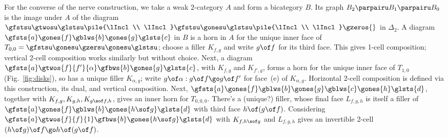 For the converse of the nerve construction, we take a weak $2$-category $A$
and form a bicategory $B$.  Its graph $B_2 \parpairu B_1 \parpairu B_0$ is
the image under $A$ of the diagram $\gfstsu\gtwosu\glstsu \pile{\lIncl \\
\lIncl} \gfstsu\gonesu\glstsu \pile{\lIncl \\ \lIncl} \gzeros{}$ in
$\Delta_2$.  A diagram $\gfsts{a}\gones{f}\gblws{b}\gones{g}\glsts{c}$ in $B$
is a horn in $A$ for the unique inner face of $T_{0,0} =
\gfstsu\gonesu\gzersu\gonesu\glstsu$; choose a filler $K_{f,g}$ and write
$g\of f$ for its third face.  This gives 1-cell composition; vertical 2-cell
composition works similarly but without choice.  Next, a diagram
$\gfsts{a}\gtwos{f}{f'}{\alpha}\gfbws{b}\gones{g}\glsts{c}$, with $K_{f,g}$
and $K_{f',g}$, forms a horn for the unique inner face of $T_{1,0}$
(Fig.~\ref{fig:disks}), so has a unique filler $K_{\alpha,g}$; write $g\of
\alpha : g\of f \go g\of f'$ for face~(e) of $K_{\alpha,g}$.  Horizontal
2-cell composition is defined via this construction, its dual, and vertical
composition.  Next, $\gfsts{a} \gones{f} \gblws{b} \gones{g} \gblws{c}
\gones{h} \glsts{d}$, together with $K_{f,g}, K_{g,h}, K_{g\sof f,h}$, gives
an inner horn for $T_{0,0,0}$.  There's a (unique?)  filler, whose final face
$L_{f,g,h}$ is itself a filler of $\gfsts{a} \gones{f} \gblws{b} \gones{h\sof
g} \glsts{d}$ with third face $h\of (g\of f)$.  Considering
$\gfsts{a}\gtwos{f}{f}{1} \gfbws{b} \gones{h\sof g}\glsts{d}$ with
$K_{f,h\sof g}$ and $L_{f,g,h}$ gives an invertible 2-cell $(h\of g)\of f \go
h\of (g\of f)$.














